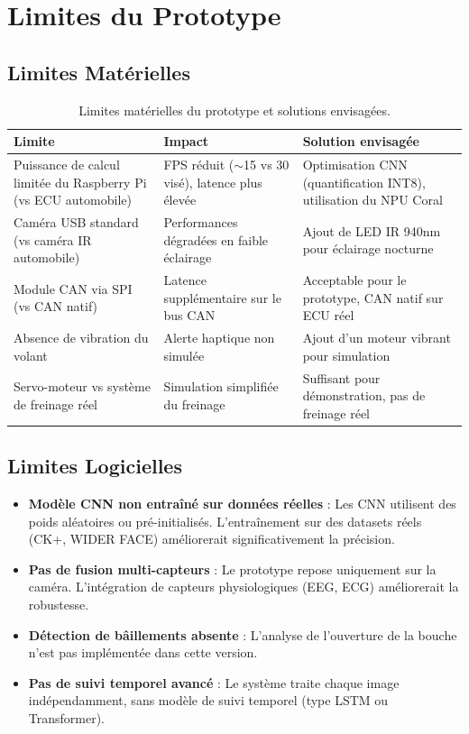 \documentclass[12pt,a4paper,twoside]{report}
\begin{document}
\section{Limites du Prototype}

\subsection{Limites Matérielles}

\begin{table}[H]
\centering
\caption{Limites matérielles du prototype et solutions envisagées.}
\label{tab:limites_materielles}
\renewcommand{\arraystretch}{1.4}
\begin{tabularx}{\textwidth}{|X|X|X|}
\hline
\rowcolor{alertorange!20}
\textbf{Limite} & \textbf{Impact} & \textbf{Solution envisagée} \\
\hline
Puissance de calcul limitée du Raspberry Pi (vs ECU automobile) & FPS réduit ($\sim$15 vs 30 visé), latence plus élevée & Optimisation CNN (quantification INT8), utilisation du NPU Coral \\
\hline
Caméra USB standard (vs caméra IR automobile) & Performances dégradées en faible éclairage & Ajout de LED IR 940nm pour éclairage nocturne \\
\hline
Module CAN via SPI (vs CAN natif) & Latence supplémentaire sur le bus CAN & Acceptable pour le prototype, CAN natif sur ECU réel \\
\hline
Absence de vibration du volant & Alerte haptique non simulée & Ajout d'un moteur vibrant pour simulation \\
\hline
Servo-moteur vs système de freinage réel & Simulation simplifiée du freinage & Suffisant pour démonstration, pas de freinage réel \\
\hline
\end{tabularx}
\end{table}

\subsection{Limites Logicielles}

\begin{itemize}[leftmargin=2cm]
    \item \textbf{Modèle CNN non entraîné sur données réelles} : Les CNN utilisent des poids aléatoires ou pré-initialisés. L'entraînement sur des datasets réels (CK+, WIDER FACE) améliorerait significativement la précision.
    \item \textbf{Pas de fusion multi-capteurs} : Le prototype repose uniquement sur la caméra. L'intégration de capteurs physiologiques (EEG, ECG) améliorerait la robustesse.
    \item \textbf{Détection de bâillements absente} : L'analyse de l'ouverture de la bouche n'est pas implémentée dans cette version.
    \item \textbf{Pas de suivi temporel avancé} : Le système traite chaque image indépendamment, sans modèle de suivi temporel (type LSTM ou Transformer).
\end{itemize}
\end{document}
